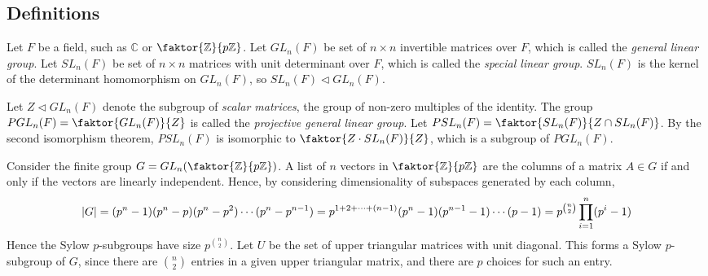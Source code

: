 \subsection{Definitions}
\begin{definition}
	Let \( F \) be a field, such as \( \mathbb C \) or \( \faktor{\mathbb Z}{p \mathbb Z} \).
	Let \( GL_n(F) \) be set of \( n \times n \) invertible matrices over \( F \), which is called the \textit{general linear group}.
	Let \( SL_n(F) \) be set of \( n \times n \) matrices with unit determinant over \( F \), which is called the \textit{special linear group}.
	\( SL_n(F) \) is the kernel of the determinant homomorphism on \( GL_n(F) \), so \( SL_n(F) \triangleleft GL_n(F) \).
	
	Let \( Z \triangleleft GL_n(F) \) denote the subgroup of \textit{scalar matrices}, the group of non-zero multiples of the identity.
	The group \( PGL_n(F) = \faktor{GL_n(F)}{Z} \) is called the \textit{projective general linear group}.
	Let \( PSL_n(F) = \faktor{SL_n(F)}{Z \cap SL_n(F)} \).
	By the second isomorphism theorem, \( PSL_n(F) \) is isomorphic to \( \faktor{Z \cdot SL_n(F)}{Z} \), which is a subgroup of \( PGL_n(F) \).
\end{definition}
\begin{example}
	Consider the finite group \( G = GL_n\qty(\faktor{\mathbb Z}{p\mathbb Z}) \).
	A list of \( n \) vectors in \( \faktor{\mathbb Z}{p\mathbb Z} \) are the columns of a matrix \( A \in G \) if and only if the vectors are linearly independent.
	Hence, by considering dimensionality of subspaces generated by each column,
	\[ \abs{G} = (p^n - 1)(p^n - p)(p^n - p^2) \cdots (p^n - p^{n-1}) = p^{1+2+\dots+(n-1)} (p^n - 1)(p^{n-1} - 1) \cdots (p - 1) = p^{\binom{n}{2}} \prod_{i=1}^n (p^i - 1) \]
	Hence the Sylow \( p \)-subgroups have size \( p^{\binom{n}{2}} \).
	Let \( U \) be the set of upper triangular matrices with unit diagonal.
	This forms a Sylow \( p \)-subgroup of \( G \), since there are \( \binom{n}{2} \) entries in a given upper triangular matrix, and there are \( p \) choices for such an entry.
\end{example}

